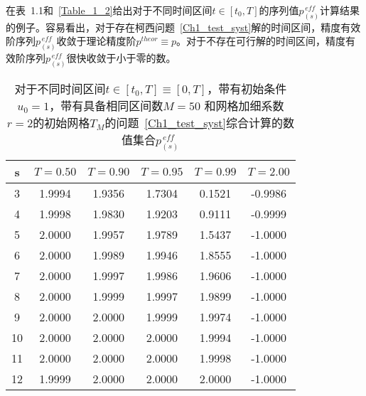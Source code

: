 \documentclass[twoside]{book}
\begin{document}
\begin{CJK*}{GBK}{song}
在表~1.1和~\ref{Table_1_2}给出对于不同时间区间$t \in [t_0,T]$的序列值$p^{\, eff}_{(s)}$计算结果的例子。容易看出，对于存在柯西问题~\eqref{Ch1_test_syst}解的时间区间，精度有效阶序列$p^{\, eff}_{(s)}$收敛于理论精度阶$p^{theor} \equiv p$。对于不存在可行解的时间区间，精度有效阶序列$p^{\, eff}_{(s)}$很快收敛于小于零的数。
\begin{table}[t]
    \label{Table_1_1}
    \begin{center}
        \begin{tabular}{c||c|c|c|c|c}
            s & $T = 0.50$ & $T = 0.90$ & $T = 0.95$ & $T = 0.99$ & $T = 2.00$ \\
            \hline\hline
            3 & 1.9994 & 1.9356 & 1.7304 & 0.1521 & -0.9986 \\
            4 & 1.9998 & 1.9830 & 1.9203 & 0.9111 & -0.9999 \\
            5 & 2.0000 & 1.9957 & 1.9789 & 1.5437 & -1.0000 \\
            6 & 2.0000 & 1.9989 & 1.9946 & 1.8555 & -1.0000 \\
            7 & 2.0000 & 1.9997 & 1.9986 & 1.9606 & -1.0000 \\
            8 & 2.0000 & 1.9999 & 1.9997 & 1.9899 & -1.0000 \\
            9 & 2.0000 & 2.0000 & 1.9999 & 1.9974 & -1.0000 \\
            10 & 2.0000 & 2.0000 & 2.0000 & 1.9994 & -1.0000 \\
            11 & 2.0000 & 2.0000 & 2.0000 & 1.9998 & -1.0000 \\
            12 & 1.9999 & 2.0000 & 2.0000 & 2.0000 & -1.0000 \\
        \end{tabular}
    \end{center}
    \caption{对于不同时间区间$t \in [t_0,T] \equiv [0,T]$，带有初始条件$u_0 = 1$，带有具备相同区间数$M = 50$ 和网格加细系数$r = 2$的初始网格$T_M$的问题~\eqref{Ch1_test_syst}综合计算的数值集合$p^{\, eff}_{(s)}$}
\end{table}


\end{CJK*}
\end{document}
